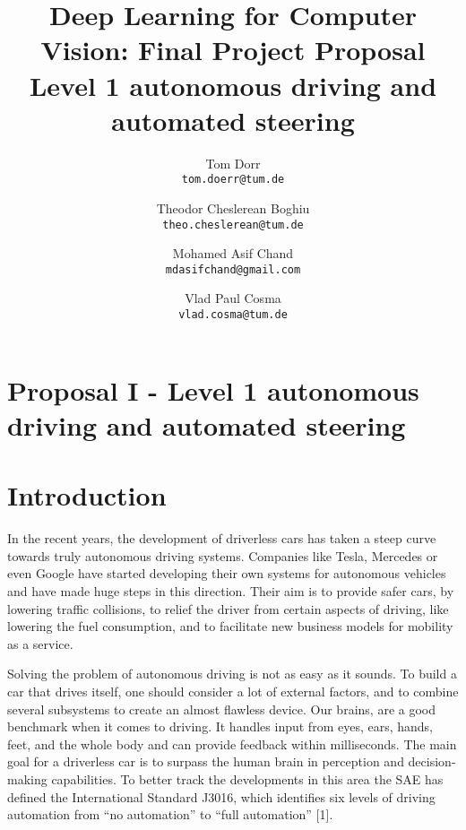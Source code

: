 \documentclass[10pt,twocolumn,letterpaper]{article}
\begin{document}
	
	\title{Deep Learning for Computer Vision: Final Project Proposal\\Level 1 autonomous driving and automated steering}
	
	\author{Tom Dorr\\
		{\tt\small tom.doerr@tum.de}
		\and
		Theodor Cheslerean Boghiu\\
		{\tt\small theo.cheslerean@tum.de}
		\and
		Mohamed Asif Chand\\
		{\tt\small mdasifchand@gmail.com}
		\and
		Vlad Paul Cosma\\
		{\tt\small vlad.cosma@tum.de}
	}
	
	\maketitle
	
	\section*{Proposal I - Level 1 autonomous driving and automated steering}
	\section{Introduction}
	In the recent years, the development of driverless cars has taken a steep curve towards truly autonomous driving systems. Companies like Tesla, Mercedes or even Google have started developing their own systems for autonomous vehicles and have made huge steps in this direction. Their aim is to provide safer cars, by lowering traffic collisions, to relief the driver from certain aspects of driving, like lowering the fuel consumption, and to facilitate new business models for mobility as a service. 
	
	Solving the problem of autonomous driving is not as easy as it sounds. To build a car that drives itself, one should consider a lot of external factors, and to combine several subsystems to create an almost flawless device. Our brains, are a good benchmark when it comes to driving. It handles input from eyes, ears, hands, feet, and the whole body and can provide feedback within milliseconds. The main goal for a driverless car is to surpass the human brain in perception and decision-making capabilities. To better track the developments in this area the SAE has defined the International Standard J3016, which identifies six levels of driving automation from “no automation” to “full automation” [1]. 
	
\end{document}
